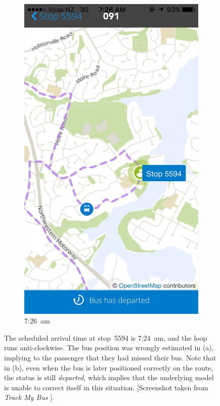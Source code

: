 \documentclass[12pt,a4paper]{article}
\begin{document}
\begin{figure}[bt]
\begin{subfigure}{0.35\textwidth}
    \includegraphics[width=\textwidth,trim={0 0 0 15cm},clip]{bus-loop-durp2.jpg}
    \caption{7:26~am}
    \label{fig:colwill-loop-2}
  \end{subfigure}
  \caption{%
    The scheduled arrival time at stop~5594 is 7:24~am,
    and the loop runs anti-clockwise.
    The bus position was wrongly estimated in (a),
    implying to the passenger that they had missed their bus.
    Note that in (b), even when the bus is later positioned correctly on the route,
    the status is still \emph{departed},
    which implies that the underlying model is unable to correct itself in this situation.\newline
    \footnotesize{[Screenshot taken from \emph{Track My Bus} \citep{trackmybus}].}}
  \label{fig:colwill-loop}
\end{figure}
\end{document}
